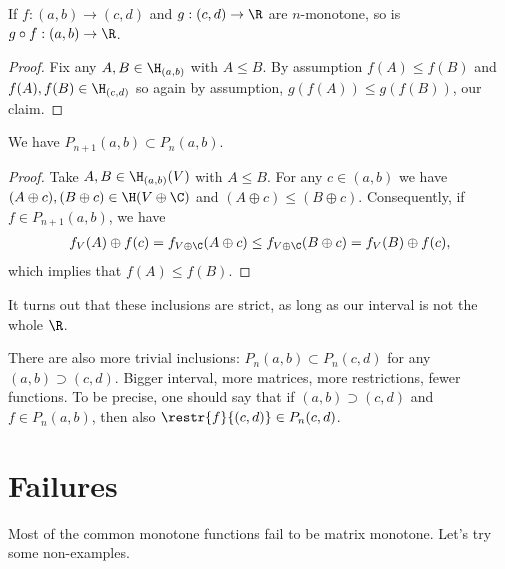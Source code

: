\begin{prop}
	If $f : (a, b) \to (c, d)$ and $g : (c, d) \to \R$ are $n$-monotone, so is $g \circ f : (a, b) \to \R$.
\end{prop}
\begin{proof}
	Fix any $A, B \in \H_{(a, b)}$ with $A \leq B$. By assumption $f(A) \leq f(B)$ and $f(A), f(B) \in \H_{(c, d)}$ so again by assumption, $g(f(A)) \leq g(f(B))$, our claim.
\end{proof}

\begin{prop}
	We have $P_{n + 1}(a, b) \subset P_{n}(a, b)$.
\end{prop}
\begin{proof}
	Take $A, B \in \H_{(a,b)}(V)$ with $A \leq B$. For any $c \in (a, b)$ we have $(A \oplus c), (B \oplus c) \in \H(V \oplus \C)$ and $(A \oplus c) \leq (B \oplus c)$. Consequently, if $f \in P_{n + 1}(a, b)$, we have
	\begin{align*}
		f_{V}(A) \oplus f(c) = f_{V \oplus \C}(A \oplus c) \leq f_{V \oplus \C}(B \oplus c) = f_{V}(B) \oplus f(c),
	\end{align*}
	which implies that $f(A) \leq f(B)$.
\end{proof}

It turns out that these inclusions are strict, as long as our interval is not the whole $\R$.

There are also more trivial inclusions: $P_{n}(a, b) \subset P_{n}(c, d)$ for any $(a, b) \supset (c, d)$. Bigger interval, more matrices, more restrictions, fewer functions. To be precise, one should say that if $(a, b) \supset (c, d)$ and $f \in P_{n}(a, b)$, then also $\restr{f}{(c, d)} \in P_{n}(c, d)$.

\section{Failures}

Most of the common monotone functions fail to be matrix monotone. Let's try some non-examples.

